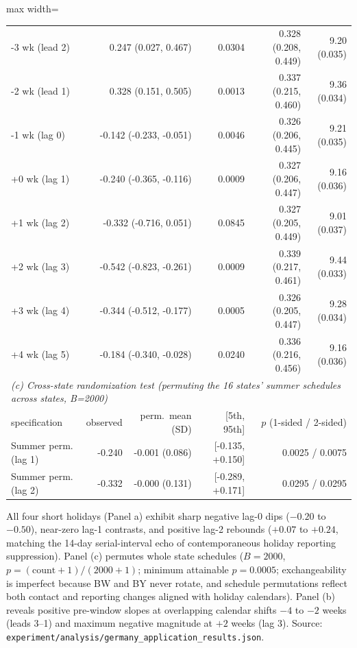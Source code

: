 \begin{table}[!t]
\begin{adjustbox}{max width=\linewidth}
\begin{tabular}{lrrrrr}
-3 wk (lead 2) & \multicolumn{2}{r}{0.247 (0.027, 0.467)} & 0.0304 & 0.328 (0.208, 0.449) & 9.20 (0.035) \\
-2 wk (lead 1) & \multicolumn{2}{r}{0.328 (0.151, 0.505)} & 0.0013 & 0.337 (0.215, 0.460) & 9.36 (0.034) \\
-1 wk (lag 0) & \multicolumn{2}{r}{-0.142 (-0.233, -0.051)} & 0.0046 & 0.326 (0.206, 0.445) & 9.21 (0.035) \\
+0 wk (lag 1) & \multicolumn{2}{r}{-0.240 (-0.365, -0.116)} & 0.0009 & 0.327 (0.206, 0.447) & 9.16 (0.036) \\
+1 wk (lag 2) & \multicolumn{2}{r}{-0.332 (-0.716, 0.051)} & 0.0845 & 0.327 (0.205, 0.449) & 9.01 (0.037) \\
+2 wk (lag 3) & \multicolumn{2}{r}{-0.542 (-0.823, -0.261)} & 0.0009 & 0.339 (0.217, 0.461) & 9.44 (0.033) \\
+3 wk (lag 4) & \multicolumn{2}{r}{-0.344 (-0.512, -0.177)} & 0.0005 & 0.326 (0.205, 0.447) & 9.28 (0.034) \\
+4 wk (lag 5) & \multicolumn{2}{r}{-0.184 (-0.340, -0.028)} & 0.0240 & 0.336 (0.216, 0.456) & 9.16 (0.036) \\
\midrule
\multicolumn{6}{l}{\emph{(c) Cross-state randomization test (permuting the 16 states' summer schedules across states, B=2000)}} \\
specification & observed & perm.\ mean (SD) & [5th, 95th] & \multicolumn{2}{r}{$p$ (1-sided / 2-sided)} \\
\midrule
Summer perm. (lag 1) & -0.240 & -0.001 (0.086) & [-0.135, +0.150] & \multicolumn{2}{r}{0.0025 / 0.0075} \\
Summer perm. (lag 2) & -0.332 & -0.000 (0.131) & [-0.289, +0.171] & \multicolumn{2}{r}{0.0295 / 0.0295} \\
\bottomrule
\end{tabular}
\end{adjustbox}
\par\smallskip\parbox{\linewidth}{\scriptsize All four short holidays (Panel a) exhibit sharp negative lag-0 dips ($-0.20$ to $-0.50$), near-zero lag-1 contrasts, and positive lag-2 rebounds ($+0.07$ to $+0.24$, matching the 14-day serial-interval echo of contemporaneous holiday reporting suppression). Panel (c) permutes whole state schedules ($B=2000$, $p = (\mathrm{count}+1)/(2000+1)$; minimum attainable $p=0.0005$; exchangeability is imperfect because BW and BY never rotate, and schedule permutations reflect both contact and reporting changes aligned with holiday calendars). Panel (b) reveals positive pre-window slopes at overlapping calendar shifts $-4$ to $-2$ weeks (leads 3--1) and maximum negative magnitude at $+2$ weeks (lag 3). Source: \texttt{experiment/analysis/germany\_application\_results.json}.}
\end{table}
